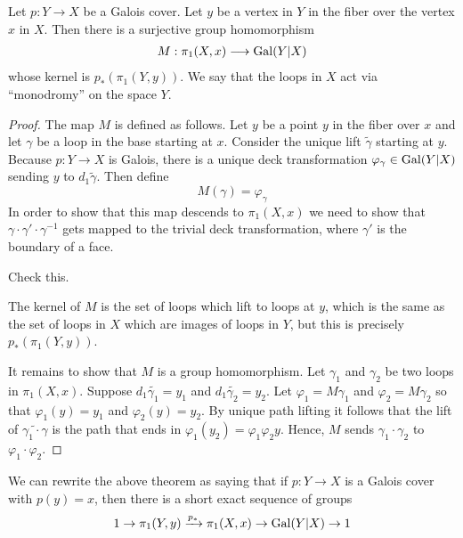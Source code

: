 \begin{theorem}
  Let $p:Y \rightarrow X$ be a Galois cover. Let $y$ be a vertex in $Y$ in the fiber over the vertex $x$ in $X$.
  Then there is a surjective group homomorphism
  \begin{align*}
    M:\pi_1(X,x) \longrightarrow \operatorname{Gal}(Y|X)
  \end{align*}
  whose kernel is $p_*(\pi_1(Y,y))$.
  We say that the loops in $X$ act via ``monodromy'' on the space $Y$.
\end{theorem}
\begin{proof}
  The map $M$ is defined as follows.
  Let $y$ be a point $y$ in the fiber over $x$ and let $\gamma$ be a loop in the base starting at $x$.
  Consider the unique lift $\widetilde{\gamma}$ starting at $y$.
  Because $p:Y \rightarrow X$ is Galois, there is a unique deck transformation $\varphi_{\gamma} \in \operatorname{Gal}(Y|X)$ sending $y$ to $d_1 \widetilde{\gamma}$.
  Then define
  \begin{equation*}
    M(\gamma) = \varphi_{\gamma}
  \end{equation*}
  In order to show that this map descends to $\pi_1(X,x)$ we need to show that $\gamma \cdot \gamma' \cdot \gamma^{-1}$ gets mapped to the trivial deck transformation, where $\gamma'$ is the boundary of a face.
  \begin{qbox}
    Check this.
  \end{qbox}

  The kernel of $M$ is the set of loops which lift to loops at $y$, which is the same as the set of loops in $X$ which are images of loops in $Y$, but this is precisely $p_*(\pi_1(Y,y))$.

  It remains to show that $M$ is a group homomorphism.
  Let $\gamma_1$ and $\gamma_2$ be two loops in $\pi_1(X,x)$. Suppose $d_1 \widetilde{\gamma_1} = y_1$ and $d_1 \widetilde{\gamma_2} = y_2$. Let $\varphi_1 = M \gamma_1$ and $\varphi_2 = M \gamma_2$ so that $ \varphi_1(y) = y_1$ and $\varphi_2(y) = y_2$.
  By unique path lifting it follows that the lift of $\widetilde{\gamma_1 \cdot \gamma}$ is the path that ends in $\varphi_1(y_2) = \varphi_1 \varphi_2 y$.
  Hence, $M$ sends $\gamma_1 \cdot \gamma_2$ to $\varphi_1 \cdot \varphi_2$.
\end{proof}


\begin{theorem}
  \label{theorem:fundamentalGroupQuotient}
  We can rewrite the above theorem as saying that if $p:Y \rightarrow X$ is a Galois cover with $p(y) = x$, then there is a short exact sequence of groups
  \begin{equation*}
    1 \rightarrow \pi_1(Y,y) \xrightarrow{p_*} \pi_1(X,x) \rightarrow \operatorname{Gal}(Y|X) \rightarrow 1
  \end{equation*}
\end{theorem}

